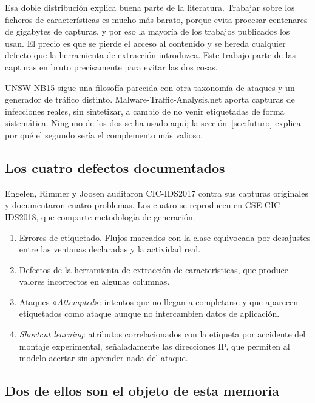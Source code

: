Esa doble distribución explica buena parte de la literatura. Trabajar sobre los
ficheros de características es mucho más barato, porque evita procesar centenares
de gigabytes de capturas, y por eso la mayoría de los trabajos publicados los
usan. El precio es que se pierde el acceso al contenido y se hereda cualquier
defecto que la herramienta de extracción introduzca. Este trabajo parte de las
capturas en bruto precisamente para evitar las dos cosas.

UNSW-NB15 \cite{Moustafa2015} sigue una filosofía parecida con otra taxonomía de
ataques y un generador de tráfico distinto.
Malware-Traffic-Analysis.net \cite{MalwareTrafficAnalysis} aporta capturas de
infecciones reales, sin sintetizar, a cambio de no venir etiquetadas de forma
sistemática. Ninguno de los dos se ha usado aquí; la
sección~\ref{sec:futuro} explica por qué el segundo sería el complemento más
valioso.

\subsection*{Los cuatro defectos documentados}

Engelen, Rimmer y Joosen \cite{Engelen2021} auditaron CIC-IDS2017 contra sus
capturas originales y documentaron cuatro problemas. Los cuatro se reproducen en
CSE-CIC-IDS2018, que comparte metodología de generación.

\begin{enumerate}
  \item Errores de etiquetado. Flujos marcados con la clase equivocada por
        desajustes entre las ventanas declaradas y la actividad real.
  \item Defectos de la herramienta de extracción de características, que produce
        valores incorrectos en algunas columnas.
  \item Ataques «\emph{Attempted}»: intentos que no llegan a completarse y que
        aparecen etiquetados como ataque aunque no intercambien datos de
        aplicación.
  \item \emph{Shortcut learning}: atributos correlacionados con la etiqueta por
        accidente del montaje experimental, señaladamente las direcciones IP, que
        permiten al modelo acertar sin aprender nada del ataque.
\end{enumerate}

\subsection*{Dos de ellos son el objeto de esta memoria}

